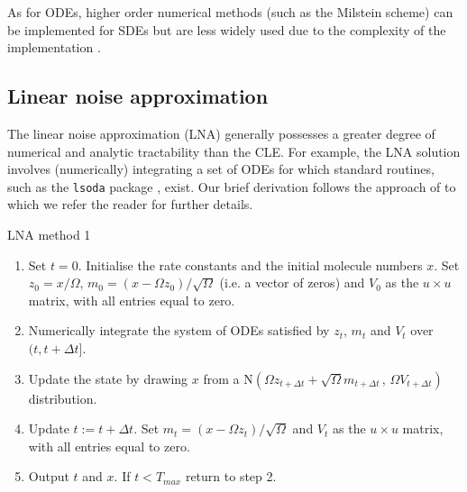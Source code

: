 \documentclass[12pt, DIV12]{scrartcl}
\begin{document}
As for ODEs, higher order numerical methods (such as the Milstein scheme) can be
implemented for SDEs but are less widely used due to the complexity of the
implementation \cite{Kloeden92}.

\subsection{Linear noise approximation}

The linear noise approximation (LNA) generally possesses a greater degree of
numerical and analytic tractability than the CLE. For example, the LNA solution
involves (numerically) integrating a set of ODEs for which standard routines,
such as the \texttt{lsoda} package \citep{petzold83}, exist. Our brief
derivation follows the approach of \cite{Wilkinson06} to which we refer the
reader for further details.

\begin{algorithm}[t]
\caption{LNA method 1}\label{A4}
\begin{enumerate}
\item Set $t=0$. Initialise the rate constants and the initial molecule numbers
  $x$. Set $z_{0}=x/\Omega$, $m_{0}=(x-\Omega z_{0})/\sqrt{\Omega}$ (i.e. a vector of zeros) and $V_{0}$ as
  the $u\times u$ matrix, with all entries equal to zero.
\item Numerically integrate the system of ODEs satisfied by $z_t$, $m_t$ and
  $V_t$ over $(t,t+\Delta t]$.
\item Update the state by drawing $x$ from a $\textrm{N}\left(\Omega z_{t+\Delta
      t}+\sqrt{\Omega}m_{t+\Delta t}\,,\, \Omega V_{t+\Delta t}\right)$
  distribution.
\item Update $t:=t+\Delta t$. Set $m_{t}=(x-\Omega z_{t})/\sqrt{\Omega}$ and $V_{t}$ as the $u\times u$
  matrix, with all entries equal to zero. 
\item Output $t$ and $x$. If $t<T_{max}$ return to step 2.
\end{enumerate}
\end{algorithm}
\end{document}
